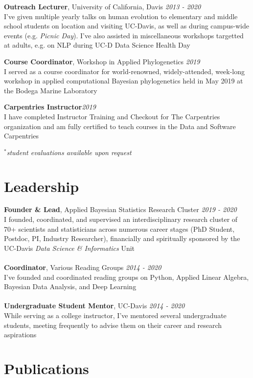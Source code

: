 \documentclass[12pt]{article}
\begin{document}
\textbf{Outreach Lecturer}, University of California, Davis \hfill \emph{2013  - 2020}\\
I've given multiple yearly talks on human evolution to elementary and middle school students on location and visiting UC-Davis, as well as during campus-wide events (e.g. \emph{Picnic Day}). I've also assisted in miscellaneous workshops targetted at adults, e.g. on NLP during UC-D Data Science Health Day

\textbf{Course Coordinator}, Workshop in Applied Phylogenetics \hfill \emph{2019}\\
I served as a course coordinator for world-renowned, widely-attended, week-long workshop in applied computational Bayesian phylogenetics held in May 2019 at the Bodega Marine Laboratory

\textbf{Carpentries Instructor}\hfill \emph{2019}\\
I have completed Instructor Training and Checkout for The Carpentries organization and am fully certified to teach courses in the Data and Software Carpentries

$^{*}$\emph{student evaluations available upon request}
\section{Leadership}

\textbf{Founder \& Lead}, Applied Bayesian Statistics Research Cluster \hfill \emph{2019 - 2020}\\
I founded, coordinated, and supervised an interdisciplinary research cluster of 70+ scientists and statisticians across numerous career stages (PhD Student, Postdoc, PI, Industry Researcher), financially and spiritually sponsored by the UC-Davis \emph{Data Science \& Informatics} Unit\\\\
\textbf{Coordinator}, Various Reading Groups \hfill \emph{2014 - 2020}\\
I've founded and coordinated reading groups on Python, Applied Linear Algebra, Bayesian Data Analysis, and Deep Learning\\\\
\textbf{Undergraduate Student Mentor}, UC-Davis \hfill \emph{2014 - 2020}\\
While serving as a college instructor, I've mentored several undergraduate students, meeting frequently to advise them on their career and research aspirations

\section{Publications}
\end{document}
